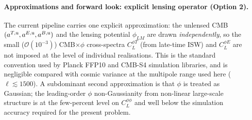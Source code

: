 \documentclass[11pt]{article}
\theoremstyle{definition}
\begin{document}
\paragraph{Approximations and forward look: explicit lensing operator (Option 2).}
The current pipeline carries one explicit approximation: the unlensed CMB $(a^{T,\rm u},a^{E,\rm u},a^{B,\rm u})$ and the lensing potential $\phi_{LM}$ are drawn \emph{independently}, so the small ($\mathcal O(10^{-3})$) CMB$\times\phi$ cross-spectra $C_L^{\phi T}$ (from late-time ISW) and $C_L^{\phi E}$ are not imposed at the level of individual realisations. This is the standard convention used by Planck FFP10 \cite{planck2018overview} and CMB-S4 simulation libraries, and is negligible compared with cosmic variance at the multipole range used here ($\ell\lesssim 1500$). A subdominant second approximation is that $\phi$ is treated as Gaussian; the leading-order $\phi$ non-Gaussianity from non-linear large-scale structure is at the few-percent level on $C_L^{\phi\phi}$ \cite{lewis2006lensing} and well below the simulation accuracy required for the present problem.
\end{document}
